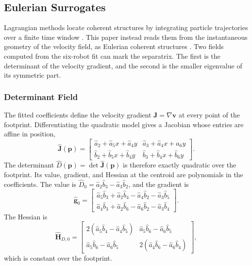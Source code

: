 \documentclass[lettersize,journal]{IEEEtran}
\begin{document}
\subsection{Eulerian Surrogates}
\label{sec:surrogates}

Lagrangian methods locate coherent structures by integrating particle
trajectories over a finite time window \cite{13,14}. This paper instead
reads them from the instantaneous geometry of the velocity field, as
Eulerian coherent structures \cite{20}. Two fields computed from the
six-robot fit can mark the separatrix. The first is the determinant of the velocity
gradient, and the second is the smaller eigenvalue of its symmetric
part.

\subsubsection{Determinant Field}
The fitted coefficients define the velocity gradient
$\mathbf{J} = \nabla\mathbf{v}$ at every point of the footprint. Differentiating the quadratic model gives a Jacobian whose
entries are affine in position,
\begin{equation}
    \hat{\mathbf{J}}(\mathbf{p}) =
    \begin{bmatrix}
        \hat{a}_2 + \hat{a}_5 x + \hat{a}_4 y &
        \hat{a}_3 + \hat{a}_4 x + \hat{a}_6 y \\
        \hat{b}_2 + \hat{b}_5 x + \hat{b}_4 y &
        \hat{b}_3 + \hat{b}_4 x + \hat{b}_6 y
    \end{bmatrix}.
    \label{eq:Jhat}
\end{equation}
The determinant $\hat{D}(\mathbf{p}) = \det\hat{\mathbf{J}}(\mathbf{p})$
is therefore exactly quadratic over the footprint. Its value, gradient,
and Hessian at the centroid are polynomials in the coefficients. The
value is $\hat{D}_0 = \hat{a}_2\hat{b}_3 - \hat{a}_3\hat{b}_2$, and the
gradient is
\begin{equation}
    \hat{\mathbf{g}}_0 =
    \begin{bmatrix}
        \hat{a}_5\hat{b}_3 + \hat{a}_2\hat{b}_4 - \hat{a}_4\hat{b}_2 - \hat{a}_3\hat{b}_5 \\
        \hat{a}_4\hat{b}_3 + \hat{a}_2\hat{b}_6 - \hat{a}_6\hat{b}_2 - \hat{a}_3\hat{b}_4
    \end{bmatrix}.
    \label{eq:grad_det}
\end{equation}
The Hessian is
\begin{equation}
    \hat{\mathbf{H}}_{D,0} =
    \begin{bmatrix}
        2(\hat{a}_5\hat{b}_4 - \hat{a}_4\hat{b}_5) &
        \hat{a}_5\hat{b}_6 - \hat{a}_6\hat{b}_5 \\
        \hat{a}_5\hat{b}_6 - \hat{a}_6\hat{b}_5 &
        2(\hat{a}_4\hat{b}_6 - \hat{a}_6\hat{b}_4)
    \end{bmatrix},
    \label{eq:hess_det}
\end{equation}
which is constant over the footprint.
\end{document}
